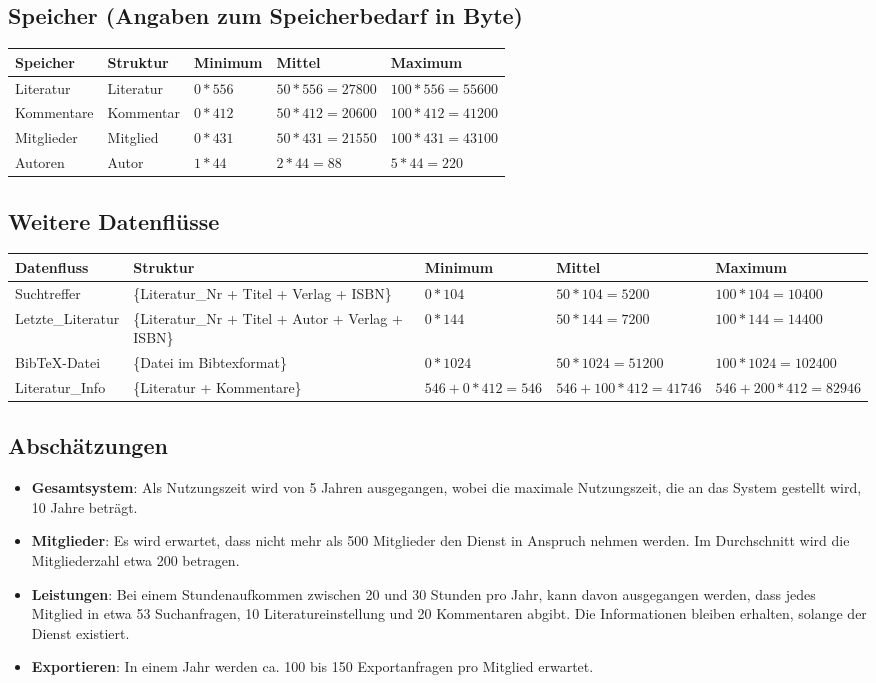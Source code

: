 \subsection{Speicher (Angaben zum Speicherbedarf in Byte)}
\begin{tabular}[ht]{|l|l|l|l|l|}
\hline
Speicher & Struktur & Minimum & Mittel & Maximum \\
\hline\hline
Literatur & {Literatur} & $0*556$ & $50*556=27800$ & $100*556=55600$ \\
Kommentare & {Kommentar} & $0*412$ & $50*412=20600$ & $100*412=41200$ \\
Mitglieder & {Mitglied}  & $0*431$ & $50*431=21550$ & $100*431=43100$ \\
Autoren & {Autor} & $1*44$ & $2*44=88$ & $5*44=220$ \\ 
\hline
\end{tabular}

\subsection{Weitere Datenflüsse}
\begin{tabular}[ht]{|l|p{4cm}|p{2cm}|p{2cm}|p{2cm}|}
\hline
Datenfluss & Struktur & Minimum & Mittel & Maximum \\
\hline\hline

Suchtreffer & \{Literatur\_Nr + Titel + Verlag + ISBN\}  & $0*104$ & $50*104=5200$ & $100*104=10400$ \\
Letzte\_Literatur & \{Literatur\_Nr + Titel + Autor + Verlag + ISBN\}  & $0*144$ & $50*144=7200$ & $100*144=14400$ \\
BibTeX-Datei & \{Datei im Bibtexformat\} & $0*1024$ & $50*1024=51200$ & $100*1024=102400$ \\
Literatur\_Info & \{Literatur + Kommentare\} & $546 + 0*412=546$ & $546 + 100*412=41746$ & $546 + 200*412=82946$ \\
\hline
\end{tabular}

\subsection{Abschätzungen}
\begin{itemize}
 \item \textbf{Gesamtsystem}: Als Nutzungszeit wird von 5 Jahren ausgegangen, wobei die maximale Nutzungszeit, 
die an das System gestellt wird, 10 Jahre betr\"agt.
 \item \textbf{Mitglieder}: Es wird erwartet, dass nicht mehr als 500 Mitglieder den Dienst in Anspruch nehmen werden. Im Durchschnitt wird
 die Mitgliederzahl etwa 200 betragen.
\item \textbf{Leistungen}: Bei einem Stundenaufkommen zwischen 20 und 30 Stunden pro Jahr, kann davon ausgegangen werden, dass jedes 
Mitglied in etwa 53 Suchanfragen, 10 Literatureinstellung und 20 Kommentaren abgibt. Die Informationen bleiben erhalten, solange der Dienst existiert.  
\item \textbf{Exportieren}: In einem Jahr werden ca. 100 bis 150 Exportanfragen pro Mitglied erwartet.
\end{itemize}

